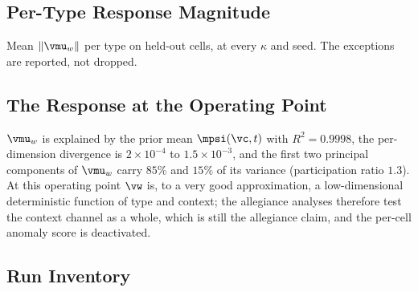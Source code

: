 \subsection{Per-Type Response Magnitude}
\label{app:w-norm}
Mean $\|\vmu_w\|$ per type on held-out cells, at every $\kappa$ and seed.  The exceptions are reported, not dropped.

\subsection{The Response at the Operating Point}
\label{app:w-prior}
 $\vmu_w$ is explained by the prior mean $\mpsi(\vc, t)$ with $R^2 = 0.9998$, the per-dimension divergence is $2\times10^{-4}$ to $1.5\times10^{-3}$, and the first two principal components of $\vmu_w$ carry $85\%$ and $15\%$ of its variance (participation ratio $1.3$). At this operating point $\vw$ is, to a very good approximation, a low-dimensional deterministic function of type and context; the allegiance analyses therefore test the context channel as a whole, which is still the allegiance claim, and the per-cell anomaly score is deactivated. 

\subsection{Run Inventory}
\label{app:runs}
